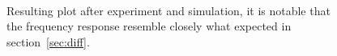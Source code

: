 \documentclass[a4paper, twocolumn]{article}
\begin{document}
\begin{figure} [!ht]
    \centering
    \\
    \caption{Resulting plot after experiment and simulation, it is notable that the frequency response resemble closely what expected in section~\ref{sec:diff}.}
    \label{fig:expDiff}
\end{figure}
\end{document}
